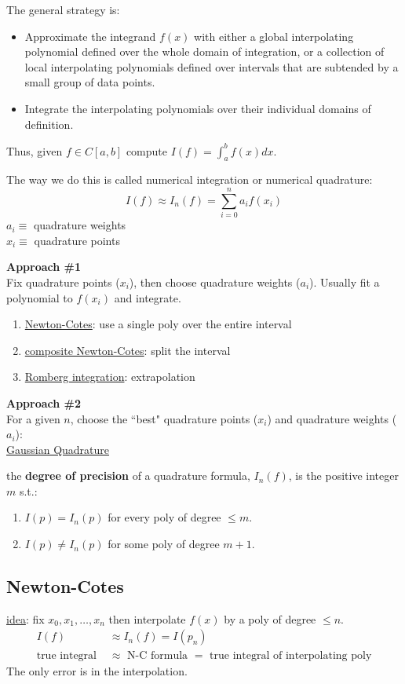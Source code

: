 \documentclass[12pt]{article}
\begin{document}
The general strategy is:
\begin{itemize}
\item Approximate the integrand $f(x)$ with either a global interpolating
polynomial defined over the whole domain of integration, or a
collection of local interpolating polynomials defined over intervals
that are subtended by a small group of data points.
\item Integrate the interpolating polynomials over their individual
domains of definition.
\end{itemize}

Thus, given $f \in C[a,b]$ compute $I(f) = \int_a^b f(x) dx$.

The way we do this is called numerical integration or numerical quadrature:
\[I(f) \approx I_n(f) = \sum_{i=0}^n a_i f(x_i)\]
$a_i \equiv$ quadrature weights\\
$x_i \equiv$ quadrature points

\textbf{Approach \#1}\\
Fix quadrature points ($x_i$), then choose quadrature weights ($a_i$). Usually fit a polynomial to $f(x_i)$ and integrate.
%
\begin{enumerate}%
\item \underline{Newton-Cotes}: use a single poly over the entire interval
\item \underline{composite Newton-Cotes}: split the interval
\item \underline{Romberg integration}: extrapolation
\end{enumerate}

\textbf{Approach \#2}\\
For a given $n$, choose the ``best" quadrature points ($x_i$) and quadrature weights ($a_i$):\\
\underline{Gaussian Quadrature}

the \textbf{degree of precision} of a quadrature formula, $I_n(f)$, is the positive integer $m$ s.t.:
\begin{enumerate}
\item $I(p) = I_n(p)$ for every poly of degree $\leq m$.
\item $I(p) \neq I_n(p)$ for some poly of degree $m+1$.
\end{enumerate}
 
\subsection{Newton-Cotes}
 
\underline{idea}: fix $x_0, x_1, \dots, x_n$ then interpolate $f(x)$ by a poly of degree $\leq n$.
%
\begin{align}
I(f) &\approx I_n(f) = I(p_n)\\
\text{true integral } &\approx \text{ N-C formula } = \text{ true integral of interpolating poly}
\end{align}
%
The only error is in the interpolation.
\end{document}
